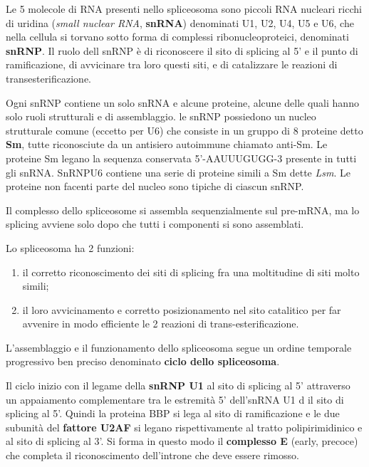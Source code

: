 \documentclass[11pt]{book}
\begin{document}
Le 5 molecole di RNA presenti nello spliceosoma sono piccoli RNA
nucleari ricchi di uridina (\emph{small nuclear RNA}, \textbf{snRNA})
denominati U1, U2, U4, U5 e U6, che nella cellula si torvano sotto forma
di complessi ribonucleoproteici, denominati \textbf{snRNP}. Il ruolo
dell snRNP è di riconoscere il sito di splicing al 5' e il punto di
ramificazione, di avvicinare tra loro questi siti, e di catalizzare le
reazioni di transesterificazione.

Ogni snRNP contiene un solo snRNA e alcune proteine, alcune delle quali
hanno solo ruoli strutturali e di assemblaggio. le snRNP possiedono un
nucleo strutturale comune (eccetto per U6) che consiste in un gruppo di
8 proteine detto \textbf{Sm}, tutte riconosciute da un antisiero
autoimmune chiamato anti-Sm. Le proteine Sm legano la sequenza
conservata 5'-AAUUUGUGG-3 presente in tutti gli snRNA. SnRNPU6 contiene
una serie di proteine simili a Sm dette \emph{Lsm}. Le proteine non
facenti parte del nucleo sono tipiche di ciascun snRNP.

Il complesso dello spliceosome si assembla sequenzialmente sul pre-mRNA,
ma lo splicing avviene solo dopo che tutti i componenti si sono
assemblati.

Lo spliceosoma ha 2 funzioni:

\begin{enumerate}
\def\labelenumi{\arabic{enumi}.}
\itemsep1pt\parskip0pt
\item
  il corretto riconoscimento dei siti di splicing fra una moltitudine di
  siti molto simili;
\item
  il loro avvicinamento e corretto posizionamento nel sito catalitico
  per far avvenire in modo efficiente le 2 reazioni di
  trans-esterificazione.
\end{enumerate}

L'assemblaggio e il funzionamento dello spliceosoma segue un ordine
temporale progressivo ben preciso denominato \textbf{ciclo dello
spliceosoma}.

Il ciclo inizio con il legame della \textbf{snRNP U1} al sito di
splicing al 5' attraverso un appaiamento complementare tra le estremità
5' dell'snRNA U1 d il sito di splicing al 5'. Quindi la proteina BBP si
lega al sito di ramificazione e le due subunità del \textbf{fattore
U2AF} si legano rispettivamente al tratto polipirimidinico e al sito di
splicing al 3'. Si forma in questo modo il \textbf{complesso E} (early,
precoce) che completa il riconoscimento dell'introne che deve essere
rimosso.
\end{document}
